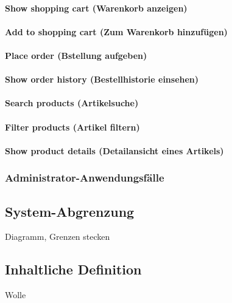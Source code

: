\paragraph{Show shopping cart (Warenkorb anzeigen)}
\paragraph{Add to shopping cart (Zum Warenkorb hinzufügen)}
\paragraph{Place order (Bstellung aufgeben)}
\paragraph{Show order history (Bestellhistorie einsehen)}
\paragraph{Search products (Artikelsuche)}
\paragraph{Filter products (Artikel filtern)}
\paragraph{Show product details (Detailansicht eines Artikels)}

\subsubsection{Administrator-Anwendungsfälle}
\subsection{System-Abgrenzung}
Diagramm, Grenzen stecken
\subsection{Inhaltliche Definition}
Wolle
